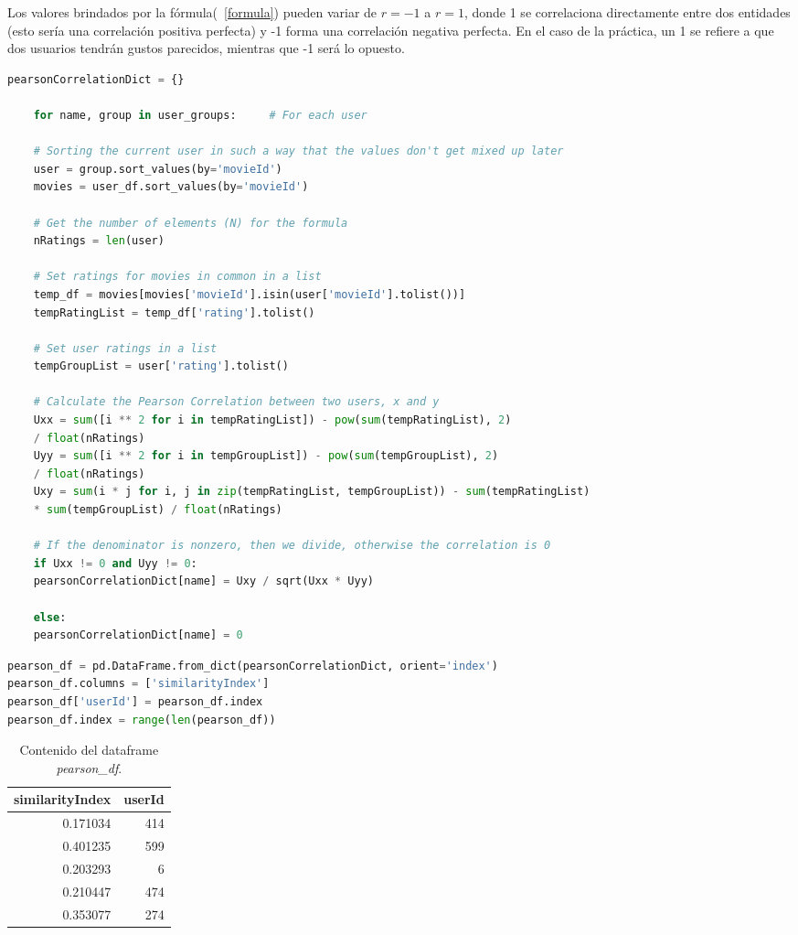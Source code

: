 \documentclass{uimppracticas}
\begin{document}
Los valores brindados por la fórmula(~\ref{formula}) pueden variar de $r=-1$ a $r=1$, donde 1 se correlaciona directamente entre dos entidades (esto sería una correlación positiva perfecta) y -1 forma una correlación negativa perfecta. En el caso de la práctica, un 1 se refiere a que dos usuarios tendrán gustos parecidos, mientras que -1 será lo opuesto.

\begin{lstlisting}[language=python]
	pearsonCorrelationDict = {}
	
	for name, group in user_groups:     # For each user
	
	# Sorting the current user in such a way that the values don't get mixed up later
	user = group.sort_values(by='movieId')
	movies = user_df.sort_values(by='movieId')
	
	# Get the number of elements (N) for the formula
	nRatings = len(user)
	
	# Set ratings for movies in common in a list
	temp_df = movies[movies['movieId'].isin(user['movieId'].tolist())]
	tempRatingList = temp_df['rating'].tolist()
	
	# Set user ratings in a list
	tempGroupList = user['rating'].tolist()
	
	# Calculate the Pearson Correlation between two users, x and y
	Uxx = sum([i ** 2 for i in tempRatingList]) - pow(sum(tempRatingList), 2) 
	/ float(nRatings)
	Uyy = sum([i ** 2 for i in tempGroupList]) - pow(sum(tempGroupList), 2) 
	/ float(nRatings)
	Uxy = sum(i * j for i, j in zip(tempRatingList, tempGroupList)) - sum(tempRatingList)  
	* sum(tempGroupList) / float(nRatings)
	
	# If the denominator is nonzero, then we divide, otherwise the correlation is 0
	if Uxx != 0 and Uyy != 0:
	pearsonCorrelationDict[name] = Uxy / sqrt(Uxx * Uyy)
	
	else:
	pearsonCorrelationDict[name] = 0
\end{lstlisting}

\begin{lstlisting}[language=python]
pearson_df = pd.DataFrame.from_dict(pearsonCorrelationDict, orient='index')
pearson_df.columns = ['similarityIndex']
pearson_df['userId'] = pearson_df.index
pearson_df.index = range(len(pearson_df))
\end{lstlisting}

\begin{table}[h]
	\centering
	\begin{tabular}{rr}
		\toprule
		similarityIndex &  userId \\
		\midrule
		0.171034 &     414 \\
		0.401235 &     599 \\
		0.203293 &       6 \\
		0.210447 &     474 \\
		0.353077 &     274 \\
		\bottomrule
	\end{tabular}
	\caption{Contenido del dataframe \textit{pearson\_df}.}
	\label{pearson}
\end{table}
\end{document}
